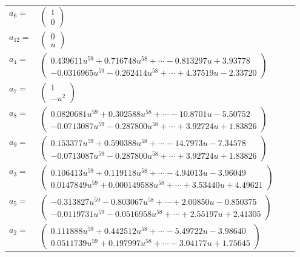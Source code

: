 \documentclass[1p]{elsarticle_modified}
\theoremstyle{definition}
\begin{document}
\begin{tabular}{m{7pt} m{180pt} m{7pt} m{180pt} }
\flushright $a_{6}=$&$\begin{pmatrix}1\\0\end{pmatrix}$ \\
\flushright $a_{12}=$&$\begin{pmatrix}0\\u\end{pmatrix}$ \\
\flushright $a_{4}=$&$\begin{pmatrix}0.439611 u^{59}+0.716748 u^{58}+\cdots-0.813297 u+3.93778\\-0.0316965 u^{59}-0.262414 u^{58}+\cdots+4.37519 u-2.33720\end{pmatrix}$ \\
\flushright $a_{7}=$&$\begin{pmatrix}1\\- u^2\end{pmatrix}$ \\
\flushright $a_{8}=$&$\begin{pmatrix}0.0820681 u^{59}+0.302588 u^{58}+\cdots-10.8701 u-5.50752\\-0.0713087 u^{59}-0.287800 u^{58}+\cdots+3.92724 u+1.83826\end{pmatrix}$ \\
\flushright $a_{9}=$&$\begin{pmatrix}0.153377 u^{59}+0.590388 u^{58}+\cdots-14.7973 u-7.34578\\-0.0713087 u^{59}-0.287800 u^{58}+\cdots+3.92724 u+1.83826\end{pmatrix}$ \\
\flushright $a_{3}=$&$\begin{pmatrix}0.106413 u^{59}+0.119118 u^{58}+\cdots-4.94013 u-3.96049\\0.0147849 u^{59}+0.000149588 u^{58}+\cdots+3.53440 u+4.49621\end{pmatrix}$ \\
\flushright $a_{5}=$&$\begin{pmatrix}-0.313827 u^{59}-0.803067 u^{58}+\cdots+2.00850 u-0.850375\\-0.0119731 u^{59}-0.0516958 u^{58}+\cdots+2.55197 u+2.41305\end{pmatrix}$ \\
\flushright $a_{2}=$&$\begin{pmatrix}0.111888 u^{59}+0.442512 u^{58}+\cdots-5.49722 u-3.98640\\0.0511739 u^{59}+0.197997 u^{58}+\cdots-3.04177 u+1.75645\end{pmatrix}$ \\

\end{tabular}
\end{document}
